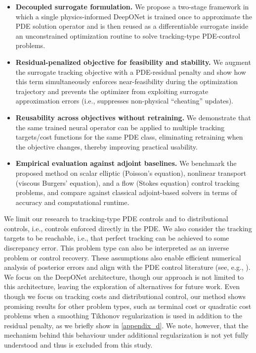 \documentclass[final,1p,times]{elsarticle}
\theoremstyle{plain} %
\theoremstyle{definition} %
\theoremstyle{remark} %
\begin{document}
\begin{itemize}
    \item \textbf{Decoupled surrogate formulation.} We propose a two-stage framework in which a single physics-informed DeepONet is trained once to approximate the PDE solution operator and is then reused as a differentiable surrogate inside an unconstrained optimization routine to solve tracking-type PDE-control problems.
    \item \textbf{Residual-penalized objective for feasibility and stability.} We augment the surrogate tracking objective with a PDE-residual penalty and show how this term simultaneously enforces near-feasibility during the optimization trajectory and prevents the optimizer from exploiting surrogate approximation errors (i.e., suppresses non-physical ``cheating'' updates).
    \item \textbf{Reusability across objectives without retraining.} We demonstrate that the same trained neural operator can be applied to multiple tracking targets/cost functions for the same PDE class, eliminating retraining when the objective changes, thereby improving practical usability.
    \item \textbf{Empirical evaluation against adjoint baselines.} We benchmark the proposed method on scalar elliptic (Poisson's equation), nonlinear transport (viscous Burgers' equation), and a flow (Stokes equation) control tracking problems, and compare against classical adjoint-based solvers in terms of accuracy and computational runtime.
\end{itemize}
We limit our research to tracking-type PDE controls and to distributional controls, i.e., controls enforced directly in the PDE. We also consider the tracking targets to be reachable, i.e., that perfect tracking can be achieved to some discrepancy error. This problem type can also be interpreted as an inverse problem or control recovery. These assumptions also enable efficient numerical analysis of posterior errors and align with the PDE control literature (see, e.g.,  \cite{Yong2024DeepMRM,Hwang2022,Demo2023,Song2023admm}). We focus on the DeepONet architecture, though our approach is not limited to this architecture, leaving the exploration of alternatives for future work. Even though we focus on tracking costs and distributional control, our method shows promising results for other problem types, such as terminal cost or quadratic cost problems when a smoothing Tikhonov regularization is used in addition to the residual penalty, as we briefly show in \ref{appendix_d}. We note, however, that the mechanism behind this behaviour under additional regularization is not yet fully understood and thus is excluded from this study.
\end{document}
